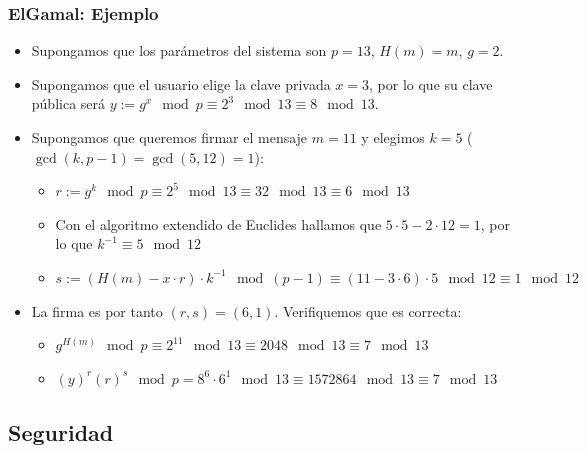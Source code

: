 \documentclass{beamer}
\begin{document}
\begin{frame}
    \frametitle{ElGamal: Ejemplo}
    \begin{itemize}
        \item Supongamos que los parámetros del sistema son $p = 13$, $H(m) = m$, $g = 2$.
        \item Supongamos que el usuario elige la clave privada $x = 3$, por lo que su clave pública será $y := g^x \mod p \equiv 2^3  \mod 13 \equiv 8 \mod 13$.
        \item Supongamos que queremos firmar el mensaje $m = 11$ y elegimos $k=5$ ($\gcd(k, p-1)=\gcd(5, 12)=1$):
        \begin{itemize}
            \item $r := g^k \mod p \equiv 2^5 \mod 13 \equiv 32 \mod 13 \equiv 6 \mod 13$
            \item Con el algoritmo extendido de Euclides hallamos que $5 \cdot 5 -2 \cdot 12 = 1$, por lo que $k^{-1} \equiv 5 \mod 12$
            \item $s := \left( H(m) - x \cdot r  \right) \cdot k^{-1} \mod \left(p-1\right) \equiv \left( 11 - 3 \cdot 6  \right) \cdot 5 \mod 12 \equiv 1 \mod 12 $
        \end{itemize}
        \item La firma es por tanto $(r, s) = (6, 1)$. Verifiquemos que es correcta:    
        \begin{itemize}
            \item $g^{H(m)} \mod p \equiv 2^{11} \mod 13 \equiv 2048 \mod 13 \equiv 7 \mod 13 $
            \item $\left(y\right)^r \left(r\right)^s \mod p = 8^6 \cdot 6^1 \mod 13 \equiv 1572864 \mod 13 \equiv 7 \mod 13 $
        \end{itemize}
    \end{itemize}    
\end{frame}

\subsection{Seguridad}
\end{document}
